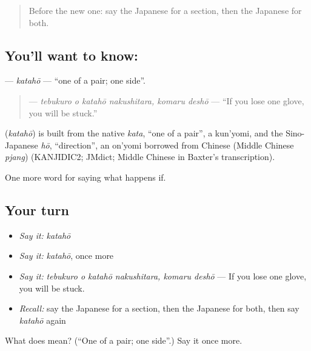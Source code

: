 \begin{quote}
Before the new one: say the Japanese for a section, then the Japanese for both.
\end{quote}

\subsection*{You'll want to know: }
\textbf{} — \emph{katahō} — \textquotedblleft{}one of a pair; one side\textquotedblright{}.

\begin{quote}
\textbf{  } — \emph{tebukuro o katahō nakushitara, komaru deshō} — \textquotedblleft{}If you lose one glove, you will be stuck.\textquotedblright{}
\end{quote}

\begin{cousinweb}
\textbf{} (\emph{katahō}) is built from the native \emph{kata}, \textquotedblleft{}one of a pair\textquotedblright{}, a kun'yomi, and the Sino-Japanese \emph{hō}, \textquotedblleft{}direction\textquotedblright{}, an on'yomi borrowed from Chinese (Middle Chinese \emph{pjang}) (KANJIDIC2; JMdict; Middle Chinese in Baxter's transcription).
\end{cousinweb}

\begin{grammarlens}[title={What you've built}]
One more word for saying what happens if.
\end{grammarlens}

\subsection*{Your turn}
\begin{itemize}
\raggedright
  \item \emph{Say it:} \emph{katahō}
  \item \emph{Say it:} \emph{katahō}, once more
  \item \emph{Say it:} \emph{tebukuro o katahō nakushitara, komaru deshō} — If you lose one glove, you will be stuck.
  \item \emph{Recall:} say the Japanese for a section, then the Japanese for both, then say \emph{katahō} again
\end{itemize}

\begin{tcolorbox}[breakable,colback=teal!4,colframe=teal!35!black,title={Before you move on}]
What does  mean? (\textquotedblleft{}One of a pair; one side\textquotedblright{}.) Say it once more.
\end{tcolorbox}
